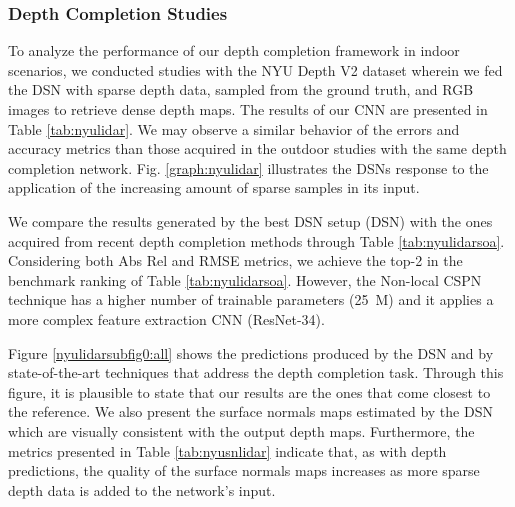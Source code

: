 \documentclass[5p]{elsarticle}
\begin{document}
\subsubsection{Depth Completion Studies}

To analyze the performance of our depth completion framework in indoor scenarios, we conducted studies with the NYU Depth V2 dataset \cite{silberman2012indoor} wherein we fed the DSN with sparse depth data, sampled from the ground truth, and RGB images to retrieve dense depth maps. The results of our CNN are presented in Table \ref{tab:nyulidar}. We may observe a similar behavior of the errors and accuracy metrics than those acquired in the outdoor studies with the same depth completion network. Fig. \ref{graph:nyulidar} illustrates the DSNs response to the application of the increasing amount of sparse samples in its input.

We compare the results generated by the best DSN setup (DSN) with the ones acquired from recent depth completion methods through Table \ref{tab:nyulidarsoa}. Considering both Abs Rel and RMSE metrics, we achieve the top-2 in the benchmark ranking of Table \ref{tab:nyulidarsoa}. However, the Non-local CSPN technique \cite{park2020non} has a higher number of trainable parameters (25\ M) and it applies a more complex feature extraction CNN (ResNet-34).

Figure \ref{nyulidarsubfig0:all} shows the predictions produced by the DSN and by state-of-the-art techniques that address the depth completion task. Through this figure, it is plausible to state that our results are the ones that come closest to the reference. We also present the surface normals maps estimated by the DSN which are visually consistent with the output depth maps. Furthermore, the metrics presented in Table \ref{tab:nyusnlidar} indicate that, as with depth predictions, the quality of the surface normals maps increases as more sparse depth data is added to the network's input. 
\end{document}
